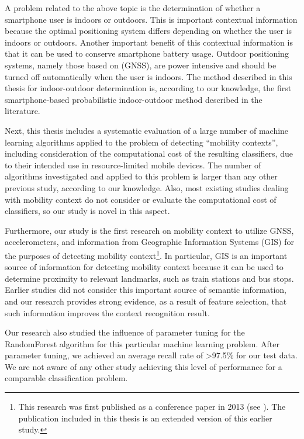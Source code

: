 A problem related to the above topic is the determination of whether a smartphone user is indoors or outdoors. This is important contextual information because the optimal positioning system differs depending on whether the user is indoors or outdoors. Another important benefit of this contextual information is that it can be used to conserve smartphone battery usage. Outdoor positioning systems, namely those based on  (GNSS), are power intensive and should be turned off automatically when the user is indoors. The method described in this thesis for indoor-outdoor determination is, according to our knowledge, the first smartphone-based probabilistic indoor-outdoor method described in the literature.

Next, this thesis includes a systematic evaluation of a large number of machine learning algorithms applied to the problem of detecting ``mobility contexts'', including consideration of the computational cost of the resulting classifiers, due to their intended use in resource-limited mobile devices. The number of algorithms investigated and applied to this problem is larger than any other previous study, according to our knowledge. Also, most existing studies dealing with mobility context do not consider or evaluate the computational cost of classifiers, so our study is novel in this aspect.

Furthermore, our study is the first research on mobility context to utilize GNSS, accelerometers, and information from Geographic Information Systems (GIS) for the purposes of detecting mobility context\footnote{This research was first published as a conference paper in 2013 (see \cite{Guinness2013}). The publication included in this thesis is an extended version of this earlier study.}. In particular, GIS is an important source of information for detecting mobility context because it can be used to determine proximity to relevant landmarks, such as train stations and bus stops. Earlier studies did not consider this important source of semantic information, and our research provides strong evidence, as a result of feature selection, that such information improves the context recognition result.

Our research also studied the influence of parameter tuning for the RandomForest algorithm for this particular machine learning problem. After parameter tuning, we achieved an average recall rate of \textgreater97.5\% for our test data. We are not aware of any other study achieving this level of performance for a comparable classification problem.

